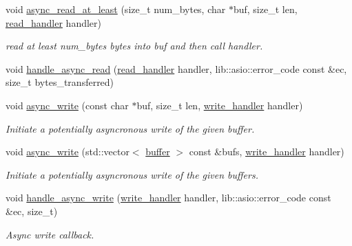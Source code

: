 \begin{DoxyCompactItemize}
void \hyperlink{classwebsocketpp_1_1transport_1_1asio_1_1connection_a1ed9a4a93e753c4b84118760195f484c}{async\+\_\+read\+\_\+at\+\_\+least} (size\+\_\+t num\+\_\+bytes, char $\ast$buf, size\+\_\+t len, \hyperlink{namespacewebsocketpp_1_1transport_a3a9b2ed54dfcc6ebe7d7e6b4c02f53fb}{read\+\_\+handler} handler)
\begin{DoxyCompactList}\small\item\em read at least num\+\_\+bytes bytes into buf and then call handler. \end{DoxyCompactList}\item 
void \hyperlink{classwebsocketpp_1_1transport_1_1asio_1_1connection_a0f3c75498e3ff2246b6842fc8cb4711b}{handle\+\_\+async\+\_\+read} (\hyperlink{namespacewebsocketpp_1_1transport_a3a9b2ed54dfcc6ebe7d7e6b4c02f53fb}{read\+\_\+handler} handler, lib\+::asio\+::error\+\_\+code const \&ec, size\+\_\+t bytes\+\_\+transferred)
\item 
void \hyperlink{classwebsocketpp_1_1transport_1_1asio_1_1connection_a9c17ab9142868c2dd2ff74c478173bb3}{async\+\_\+write} (const char $\ast$buf, size\+\_\+t len, \hyperlink{namespacewebsocketpp_1_1transport_addf5d728159e7aa2bce2a0df947b1560}{write\+\_\+handler} handler)
\begin{DoxyCompactList}\small\item\em Initiate a potentially asyncronous write of the given buffer. \end{DoxyCompactList}\item 
void \hyperlink{classwebsocketpp_1_1transport_1_1asio_1_1connection_a9f62627d2a0fd05278a0fb1d8761911b}{async\+\_\+write} (std\+::vector$<$ \hyperlink{structwebsocketpp_1_1transport_1_1buffer}{buffer} $>$ const \&bufs, \hyperlink{namespacewebsocketpp_1_1transport_addf5d728159e7aa2bce2a0df947b1560}{write\+\_\+handler} handler)
\begin{DoxyCompactList}\small\item\em Initiate a potentially asyncronous write of the given buffers. \end{DoxyCompactList}\item 
void \hyperlink{classwebsocketpp_1_1transport_1_1asio_1_1connection_a5f0bb67448323c4653f564397dcb0fe8}{handle\+\_\+async\+\_\+write} (\hyperlink{namespacewebsocketpp_1_1transport_addf5d728159e7aa2bce2a0df947b1560}{write\+\_\+handler} handler, lib\+::asio\+::error\+\_\+code const \&ec, size\+\_\+t)
\begin{DoxyCompactList}\small\item\em Async write callback. \end{DoxyCompactList}\item 

\end{DoxyCompactItemize}
